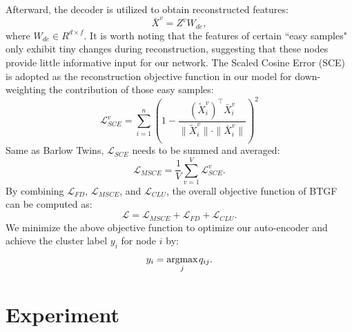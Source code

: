 \documentclass[letterpaper]{article} %
\begin{document}
Afterward, the decoder is utilized to obtain reconstructed features: 
\begin{equation}
    \bar{X}^v = Z^v W_{de},
\end{equation}
where $W_{de} \in R^{d \times f}$. It is worth noting that the features of certain ``easy samples" only exhibit tiny changes during reconstruction, suggesting that these nodes provide little informative input for our network. The Scaled Cosine Error (SCE) \cite{hou2022graphmae} is adopted as the reconstruction objective function in our model for down-weighting the contribution of those easy samples:
\begin{equation}\label{loss: sce}
\mathcal{L}^v_{SCE} = \sum_{i=1}^n \left(1 - \frac{{(\widetilde{X}^v_i)^{\top} \bar{X}^v_i}}{{\|\widetilde{X}^v_i\| \cdot \|\bar{X}^v_i\|}}\right)^2
\end{equation}
Same as Barlow Twins,  $\mathcal{L}_{SCE}$ needs to be summed and averaged:
\begin{equation}
\mathcal{L}_{MSCE} = \frac{1}{V} \sum^{V}_{v=1} \mathcal{L}^{v}_{SCE}.
\end{equation}
By combining $\mathcal{L}_{FD}$, $\mathcal{L}_{MSCE}$, and $\mathcal{L}_{C L U}$, the overall objective function of BTGF can be computed as:
\begin{equation}\label{loss: all}
    \mathcal{L}=\mathcal{L}_{MSCE} + \mathcal{L}_{FD}+ \mathcal{L}_{CLU}.
\end{equation}
We minimize the above objective function to optimize our auto-encoder and achieve the cluster label $y_i$ for node $i$ by:
\begin{equation}\label{node clustering}
    y_i=\underset{j}{\operatorname{argmax}}\hspace{0.4mm} q_{i j}.
\end{equation}


\section{Experiment}
\end{document}
